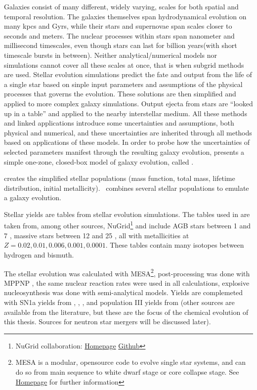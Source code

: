 Galaxies consist of many different, widely varying, scales for both spatial and temporal resolution.
The galaxies themselves span hydrodynamical evolution on many kpcs and Gyrs, while their stars and supernovae span scales closer to seconds and meters.
The nuclear processes within stars span nanometer and millisecond timescales, even though stars can last for billion years(with short timescale bursts in between).
Neither analytical/numerical models nor simulations cannot cover all these scales at once, that is when subgrid methods are used. Stellar evolution simulations predict the fate and output from the life of a single star based on sinple input parameters and assumptions of the physical processes that governs the evolution. These solutions are then simplified and applied to more complex galaxy simulations.
Output ejecta from stars are ``looked up in a table'' and applied to the nearby interstellar medium.
All these methods and linked applications introduce some uncertainties and assumptions, both physical and numerical, and these uncertainties are inherited through all methods based on applications of these models. In order to probe how the uncertainties of selected parameters manifest through the resulting galaxy evolution,  presents a simple one-zone, closed-box model of galaxy evolution, called \omegamodel.



\sygma creates the simplified stellar populations (mass function, total mass, lifetime distribution, initial metallicity).
\omegamodel\ combines several stellar populations to emulate a galaxy evolution.

Stellar yields are tables from stellar evolution simulations.
The tables used in \omegamodel are taken from, among other sources,  NuGrid\footnote{NuGrid collaboration: \href{http://www.astro.keele.ac.uk/nugrid/}{Homepage} \href{https://github.com/nugrid}{Github}} and include AGB stars between 1 and 7 \msol, massive stars between 12 and 25 \msol, all with metallicities at $Z = 0.02, 0.01, 0.006, 0.001, 0.0001$. These tables contain many isotopes between hydrogen and bismuth.

The stellar evolution was calculated with MESA\footnote{MESA is a modular, opensource code to evolve single star systems, and can do so from main sequence to white dwarf stage or core collapse stage. See \href{http://mesa.sourceforge.net}{Homepage} for further information}, post-processing was done with MPPNP , the same nuclear reaction rates were used in all calculations, explosive nucleosynthesis was done with semi-analytical models. Yields are complemeted with SN1a yields from , , ,  and population III yields from  (other sources are available from the literature, but these are the focus of the chemical evolution of this thesis. Sources for neutron star mergers will be discussed later).

